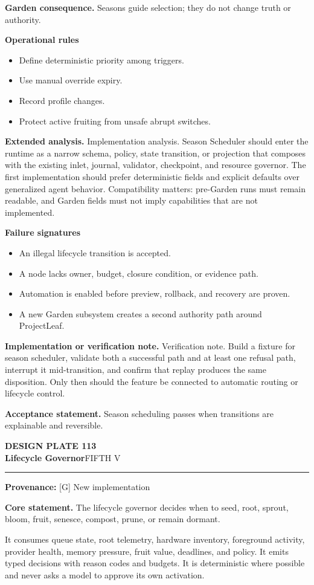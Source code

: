 \documentclass[10pt,letterpaper,oneside]{article}
\newcommand{\prov}[1]{\textcolor{gardenBlue}{\sffamily\footnotesize\textbf{Provenance:} #1}}
\newcommand{\platetitle}[3]{%
  \begin{minipage}[t][0.54in][t]{\textwidth}
  {\sffamily\bfseries\color{gardenDeep}\fontsize{9}{10}\selectfont DESIGN PLATE #1}\\[-1pt]
  {\sffamily\bfseries\color{gardenInk}\fontsize{16.5}{18}\selectfont #2}\hfill{\sffamily\color{gardenGreen}\large #3}
  \end{minipage}\vspace{-2pt}\hrule\vspace{5pt}}
\begin{document}
\textbf{Garden consequence.} Seasons guide selection; they do not change truth or authority.

\textbf{Operational rules}
\begin{itemize}
\item Define deterministic priority among triggers.
\item Use manual override expiry.
\item Record profile changes.
\item Protect active fruiting from unsafe abrupt switches.
\end{itemize}
\textbf{Extended analysis.} Implementation analysis. Season Scheduler should enter the runtime as a narrow schema, policy, state transition, or projection that composes with the existing inlet, journal, validator, checkpoint, and resource governor. The first implementation should prefer deterministic fields and explicit defaults over generalized agent behavior. Compatibility matters: pre-Garden runs must remain readable, and Garden fields must not imply capabilities that are not implemented.

\textbf{Failure signatures}
\begin{itemize}
\item An illegal lifecycle transition is accepted.
\item A node lacks owner, budget, closure condition, or evidence path.
\item Automation is enabled before preview, rollback, and recovery are proven.
\item A new Garden subsystem creates a second authority path around ProjectLeaf.
\end{itemize}
\textbf{Implementation or verification note.} Verification note. Build a fixture for season scheduler, validate both a successful path and at least one refusal path, interrupt it mid-transition, and confirm that replay produces the same disposition. Only then should the feature be connected to automatic routing or lifecycle control.

\begin{acceptbox}
\textbf{Acceptance statement.} Season scheduling passes when transitions are explainable and reversible.
\end{acceptbox}
\newpage
\platetitle{113}{Lifecycle Governor}{FIFTH V}
\prov{[G] New implementation}
\fontsize{8.85}{10.45}\selectfont
\begin{corebox}
\textbf{Core statement.} The lifecycle governor decides when to seed, root, sprout, bloom, fruit, senesce, compost, prune, or remain dormant.
\end{corebox}
It consumes queue state, root telemetry, hardware inventory, foreground activity, provider health, memory pressure, fruit value, deadlines, and policy. It emits typed decisions with reason codes and budgets. It is deterministic where possible and never asks a model to approve its own activation.
\end{document}
